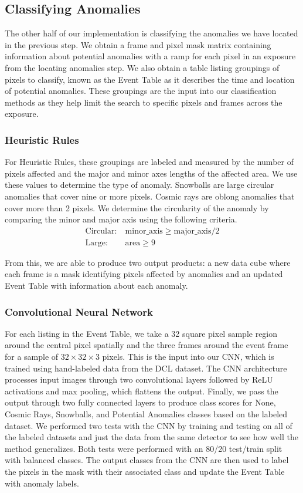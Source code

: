 \subsection{Classifying Anomalies}
The other half of our implementation is classifying the anomalies we have located in the previous step.
We obtain a frame and pixel mask matrix containing information about potential anomalies with a ramp for each pixel in an exposure from the locating anomalies step.
We also obtain a table listing groupings of pixels to classify, known as the Event Table as it describes the time and location of potential anomalies. 
These groupings are the input into our classification methods as they help limit the search to specific pixels and frames across the exposure. 

\subsubsection{Heuristic Rules}
For Heuristic Rules, these groupings are labeled and measured by the number of pixels affected and the major and minor axes lengths of the affected area. 
We use these values to determine the type of anomaly.
Snowballs are large circular anomalies that cover nine or more pixels.
Cosmic rays are oblong anomalies that cover more than 2 pixels. 
We determine the circularity of the anomaly by comparing the minor and major axis using the following criteria.
\begin{align*}
    \text{Circular:}\ &  \text{minor\_axis} \geq \text{major\_axis}/2 \\
    \text{Large:}\ & \text{area} \geq 9
\end{align*}

From this, we are able to produce two output products: a new data cube where each frame is a mask identifying pixels affected by anomalies and an updated Event Table with information about each anomaly. 

\subsubsection{Convolutional Neural Network}
\label{rst/sec:CNN}
For each listing in the Event Table, we take a 32 square pixel sample region around the central pixel spatially and the three frames around the event frame for a sample of $32 \times 32  \times 3$ pixels. 
This is the input into our CNN, which is trained using hand-labeled data from the DCL dataset. 
The CNN architecture processes input images through two convolutional layers followed by ReLU activations and max pooling, which flattens the output.
Finally, we pass the output through two fully connected layers to produce class scores for None, Cosmic Rays, Snowballs, and Potential Anomalies classes based on the labeled dataset.
We performed two tests with the CNN by training and testing on all of the labeled datasets and just the data from the same detector to see how well the method generalizes. 
Both tests were performed with an 80/20 test/train split with balanced classes. 
The output classes from the CNN are then used to label the pixels in the mask with their associated class and update the Event Table with anomaly labels. 
